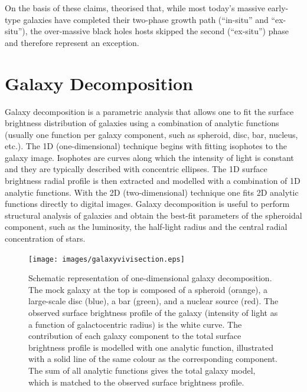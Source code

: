 On the basis of these claims, \cite{ferremateu2015} theorised that, 
while most today's massive early-type galaxies have completed their two-phase growth path (``in-situ'' and ``ex-situ''), 
the over-massive black holes hosts skipped the second (``ex-situ'') phase and therefore represent an exception. 


\section{Galaxy Decomposition}
Galaxy decomposition is a parametric analysis that allows one to fit the surface brightness distribution
of galaxies using a combination of analytic functions (usually one function per
galaxy component, such as spheroid, disc, bar, nucleus, etc.). 
The 1D (one-dimensional) technique begins with fitting isophotes to the galaxy image.
Isophotes are curves along which the intensity of light is constant 
and they are typically described with concentric ellipses.  
The 1D surface brightness radial profile is then extracted and modelled with a combination of 1D analytic functions. 
With the 2D (two-dimensional) technique one fits 2D analytic functions directly to digital images. 
Galaxy decomposition is useful to perform structural analysis of galaxies and obtain the best-fit 
parameters of the spheroidal component, such as the luminosity, the half-light radius 
and the central radial concentration of stars. \\

\begin{figure}[htb]
\begin{center}
\texttt{[image: images/galaxyvivisection.eps]}
\end{center}
\caption{Schematic representation of one-dimensional galaxy decomposition. 
The mock galaxy at the top is composed of a spheroid (orange), a large-scale disc (blue), 
a bar (green), and a nuclear source (red). 
The observed surface brightness profile of the galaxy (intensity of light as a function of galactocentric radius) 
is the white curve. 
The contribution of each galaxy component to the total surface brightness profile is modelled with one analytic function, 
illustrated with a solid line of the same colour as the corresponding component. 
The sum of all analytic functions gives the total galaxy model, 
which is matched to the observed surface brightness profile. }
\end{figure}

